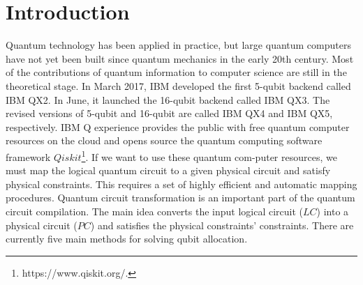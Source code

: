 \documentclass[runningheads]{llncs}
\begin{document}
\section{Introduction}
\label{Introduction}
Quantum technology has been applied in practice, but large quantum computers have not yet been built since quantum mechanics in the early 20th century. Most of the contributions of quantum information to computer science are still in the theoretical stage. In March 2017, IBM developed the first 5-qubit  backend called IBM  QX2.  In June,  it launched the  16-qubit  backend called IBM QX3. The revised versions of 5-qubit and 16-qubit are called IBM QX4 and IBM QX5, respectively. IBM Q experience provides the public with free quantum computer resources on the cloud and opens source the quantum computing software framework $Qiskit$\footnote{https://www.qiskit.org/.}. If we want to use these quantum com-puter resources, we must map the logical quantum circuit to a given physical circuit and satisfy physical constraints. This requires a set of highly efficient and automatic mapping procedures. Quantum circuit transformation is an important part of the quantum circuit compilation. The main idea converts the input logical circuit ($LC$) into a physical circuit ($PC$) and satisfies the physical constraints' constraints.
There are currently five main methods for solving qubit allocation.
\end{document}
